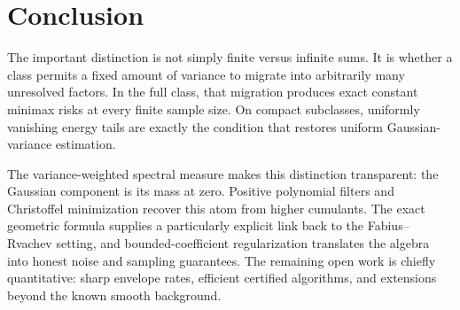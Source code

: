 \documentclass[11pt,letterpaper]{article}
\numberwithin{equation}{section}
\theoremstyle{definition}
\theoremstyle{remark}
\begin{document}
\section{Conclusion}
The important distinction is not simply finite versus infinite sums. It is
whether a class permits a fixed amount of variance to migrate into arbitrarily
many unresolved factors. In the full class, that migration produces exact
constant minimax risks at every finite sample size. On compact subclasses,
uniformly vanishing energy tails are exactly the condition that restores
uniform Gaussian-variance estimation.

The variance-weighted spectral measure makes this distinction transparent:
the Gaussian component is its mass at zero. Positive polynomial filters and
Christoffel minimization recover this atom from higher cumulants. The exact
geometric formula supplies a particularly explicit link back to the
Fabius--Rvachev setting, and bounded-coefficient regularization translates the
algebra into honest noise and sampling guarantees. The remaining open work is
chiefly quantitative: sharp envelope rates, efficient certified algorithms,
and extensions beyond the known smooth background.
\end{document}
